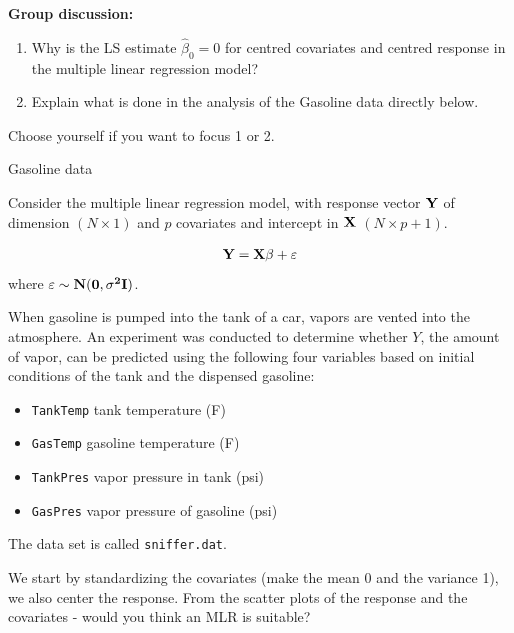 \documentclass[
  ignorenonframetext,
]{beamer}
\providecommand{\tightlist}{%
  \setlength{\itemsep}{0pt}\setlength{\parskip}{0pt}}
\begin{document}
\begin{frame}[fragile]

\textbf{Group discussion:}

\begin{enumerate}
[1)]
\item
  Why is the LS estimate \(\hat{\beta}_0=0\) for centred covariates and
  centred response in the multiple linear regression model?
\item
  Explain what is done in the analysis of the Gasoline data directly
  below.
\end{enumerate}

\begin{block}{Choose yourself if you want to focus 1 or 2.}

\end{block}

\begin{block}{Gasoline data}

Consider the multiple linear regression model, with response vector
\(\bf{Y}\) of dimension \((N \times 1)\) and \(p\) covariates and
intercept in \(\bf{X}\) \((N \times p+1)\).

\begin{align}
 \bf{Y} = \bf{X}\bf{\beta} + \bf{\varepsilon}
\end{align} where \(\bf{\varepsilon}\sim N(\bf{0},\sigma^2\bf{I})\).

When gasoline is pumped into the tank of a car, vapors are vented into
the atmosphere. An experiment was conducted to determine whether \(Y\),
the amount of vapor, can be predicted using the following four variables
based on initial conditions of the tank and the dispensed gasoline:

\begin{itemize}
\tightlist
\item
  \texttt{TankTemp} tank temperature (F)
\item
  \texttt{GasTemp} gasoline temperature (F)
\item
  \texttt{TankPres} vapor pressure in tank (psi)
\item
  \texttt{GasPres} vapor pressure of gasoline (psi)
\end{itemize}

The data set is called \texttt{sniffer.dat}.

We start by standardizing the covariates (make the mean 0 and the
variance 1), we also center the response. From the scatter plots of the
response and the covariates - would you think an MLR is suitable?

\end{block}

\end{frame}
\end{document}
